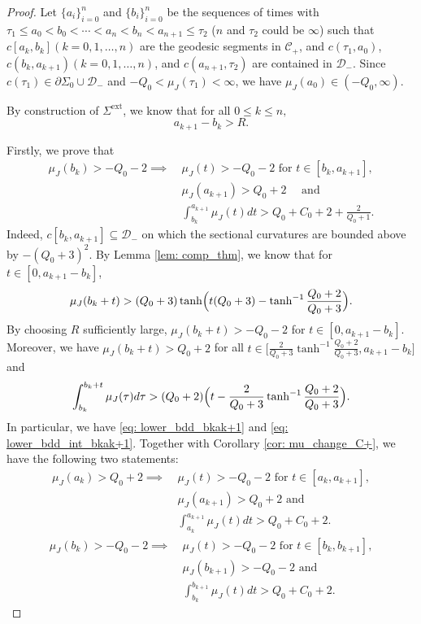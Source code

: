 \documentclass[JEP,XML,SOM,Unicode,NoFloatCountersInSection]{cedram}
\newcommand{\ext}{\mathrm{ext}}
\theoremstyle{definition}
\renewcommand{\>}{{\rangle}}
\newcommand{\<}{{\langle}}
\begin{document}
\begin{proof}

Let $\{a_i\}^n_{i=0}$ and $\{b_i\}^n_{i=0}$ be the sequences of times with $\tau_1\leq a_0<b_0<\cdots <a_n<b_n<a_{n+1}\leq \tau_2$ ($n$ and $\tau_2$ could be $\infty$) such that
$c[a_k, b_k] (k=0,1,\dots,n)$ are the geodesic segments in $\mathcal{C}_+$, and $c(\tau_1,a_0)$, $c(b_k,a_{k+1}) (k=0,1,\dots,n)$, and $c(a_{n+1},\tau_2)$ are contained in $\mathcal D_{-}$. Since $c(\tau_1)\in \partial\Sigma_0\cup \mathcal{D}_-$ and $-Q_0<\mu_J(\tau_1)<\infty$, we have $\mu_J(a_0)\in (-Q_0, \infty)$.

By construction of $\Sigma^{\ext}$, we know that for all $0\leq k\leq n,$
\[
a_{k+1}-b_k>R.
\]

Firstly, we prove that
\begin{align}
\mu_J(b_k)>-Q_0-2\implies\ & \mu_J(t)>-Q_0-2 \text{ for }t\in[b_k,a_{k+1}], \nonumber\\
& \mu_J(a_{k+1})>Q_0+2\quad \text{ and } \label{eq: lower_bdd_bkak+1}\\
& \int_{b_k}^{a_{k+1}}\mu_J(t)dt>Q_0+C_0+2+\frac{2}{Q_0+1}.\label{eq: lower_bdd_int_bkak+1}
\end{align}
Indeed, $c[b_k, a_{k+1}]\subseteq \mathcal{D}_-$ on which the sectional curvatures are bounded above by $-(Q_0+3)^2$. By Lemma \ref{lem: comp_thm}, we know that for $t\in[0, a_{k+1}-b_k]$,
\[
\mu_J(b_k+t)>(Q_0+3)\tanh\Bigl(t(Q_0+3)-\tanh^{-1}\frac{Q_0+2}{Q_0+3}\Bigr).
\]
By choosing $R$ sufficiently large, $\mu_J(b_k+t)>-Q_0-2$ for $t\in[0,a_{k+1}-b_k]$. Moreover, we have $\mu_J(b_k+t)>Q_0+2$ for all $t\in \bigl[\frac{2}{Q_0+3}\tanh^{-1}\frac{Q_0+2}{Q_0+3}, a_{k+1}-b_k\bigr]$ and
\begin{equation}\label{eq: lower_bdd_int_bkbk+t}
\int_{b_k}^{b_k+t}\mu_J(\tau)d\tau>(Q_0+2)\Bigl(t-\frac{2}{Q_0+3}\tanh^{-1}\frac{Q_0+2}{Q_0+3}\Bigr).
\end{equation}
In particular, we have \eqref{eq: lower_bdd_bkak+1} and \eqref{eq: lower_bdd_int_bkak+1}. Together with Corollary \ref{cor: mu_change_C+}, we have the following two statements:
\begin{align}\label{eq: lower_bdd_akak+1}
\mu_J(a_k)>Q_0+2\implies\ &\mu_J(t)>-Q_0-2 \text{ for }t\in[a_k,a_{k+1}], \\
& \mu_J(a_{k+1})>Q_0+2 \text{ and }\nonumber\\
& \int_{a_k}^{a_{k+1}}\mu_J(t)dt>Q_0+C_0+2.
\end{align}
\begin{align}\label{eq_lower_bdd_bkbk+1}
\mu_J(b_k)>-Q_0-2 \implies\ & \mu_J(t)>-Q_0-2 \text{ for }t\in[b_k,b_{k+1}], \\
& \mu_J(b_{k+1})>-Q_0-2 \text{ and }\nonumber\\
& \int_{b_k}^{b_{k+1}}\mu_J(t)dt>Q_0+C_0+2.
\end{align}


\end{proof}
\end{document}
